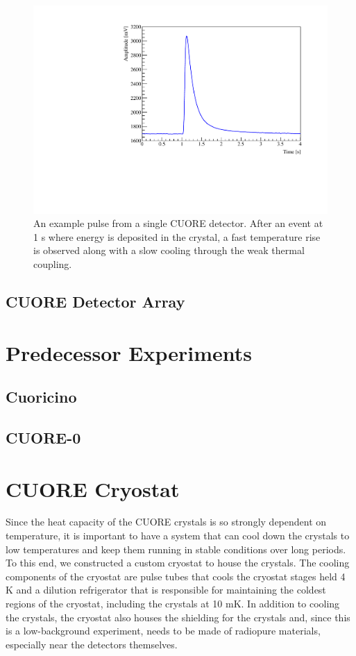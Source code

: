 \begin{figure}[htbp]
\centering
\includegraphics[width=0.7\linewidth]{Figures/pulse-conference.pdf}
\caption[An example pulse from a single CUORE detector.]{An example pulse from a single CUORE detector. After an event at 1 s where energy is deposited in the crystal, a fast temperature rise is observed along with a slow cooling through the weak thermal coupling.}
\label{fig:Sample_pulse}
\end{figure}

\subsection{CUORE Detector Array}

\section{Predecessor Experiments}

\subsection{Cuoricino}

\subsection{CUORE-0}



\section{CUORE Cryostat}
\label{sec:CUORE Cryostat}

Since the heat capacity of the CUORE crystals is so strongly dependent on temperature, it is important to have a system that can cool down the crystals to low temperatures and keep them running in stable conditions over long periods. To this end, we constructed a custom cryostat to house the crystals. The cooling components of the cryostat are pulse tubes that cools the cryostat stages held 4 K and a dilution refrigerator that is responsible for maintaining the coldest regions of the cryostat, including the crystals at 10 mK. In addition to cooling the crystals, the cryostat also houses the shielding for the crystals and, since this is a low-background experiment, needs to be made of radiopure materials, especially near the detectors themselves.

